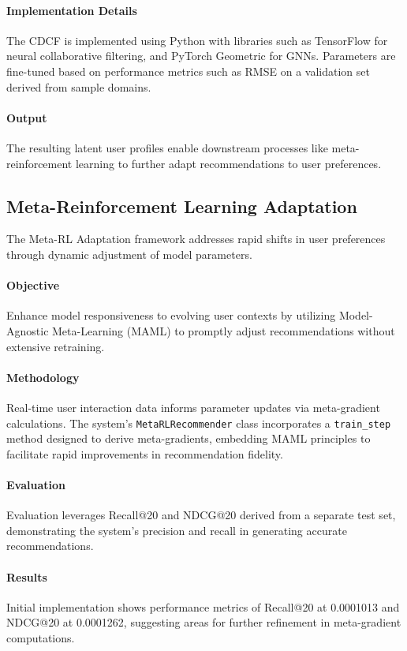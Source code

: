 \paragraph{Implementation Details}
The CDCF is implemented using Python with libraries such as TensorFlow for neural collaborative filtering, and PyTorch Geometric for GNNs. Parameters are fine-tuned based on performance metrics such as RMSE on a validation set derived from sample domains.

\paragraph{Output}
The resulting latent user profiles enable downstream processes like meta-reinforcement learning to further adapt recommendations to user preferences.

\subsection{Meta-Reinforcement Learning Adaptation}

The Meta-RL Adaptation framework addresses rapid shifts in user preferences through dynamic adjustment of model parameters.

\paragraph{Objective}
Enhance model responsiveness to evolving user contexts by utilizing Model-Agnostic Meta-Learning (MAML) to promptly adjust recommendations without extensive retraining.

\paragraph{Methodology}
Real-time user interaction data informs parameter updates via meta-gradient calculations. The system's \texttt{MetaRLRecommender} class incorporates a \texttt{train\_step} method designed to derive meta-gradients, embedding MAML principles to facilitate rapid improvements in recommendation fidelity.

\paragraph{Evaluation}
Evaluation leverages Recall@20 and NDCG@20 derived from a separate test set, demonstrating the system's precision and recall in generating accurate recommendations.

\paragraph{Results}
Initial implementation shows performance metrics of Recall@20 at 0.0001013 and NDCG@20 at 0.0001262, suggesting areas for further refinement in meta-gradient computations.

